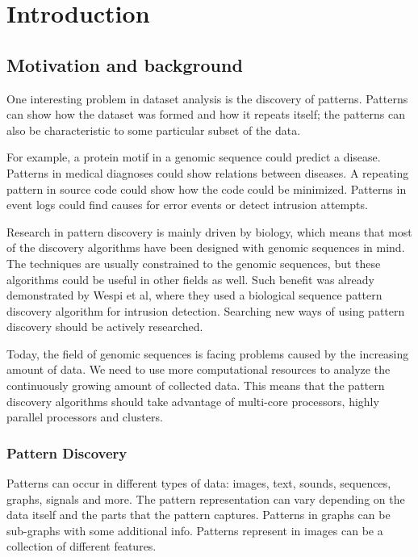 \chapter{Introduction}
\label{c:introduction}

\section{Motivation and background}

One interesting problem in dataset analysis is the discovery of patterns. Patterns can show how the dataset was formed and how it repeats itself; the patterns can also be characteristic to some particular subset of the data.

For example, a protein motif in a genomic sequence could predict a disease. Patterns in medical diagnoses could show relations between diseases. A repeating pattern in source code could show how the code could be minimized. Patterns in event logs could find causes for error events or detect intrusion attempts.

Research in pattern discovery is mainly driven by biology, which means that most of the discovery algorithms have been designed with genomic sequences in mind. The techniques are usually constrained to the genomic sequences, but these algorithms could be useful in other fields as well. Such benefit was already demonstrated by Wespi et al\cite{IntrusionDetection}, where they used a biological sequence pattern discovery algorithm for intrusion detection. Searching new ways of using pattern discovery should be actively researched.

Today, the field of genomic sequences is facing problems caused by the increasing amount of data\cite{BigData,HowIsGenomeDoing}. We need to use more computational resources to analyze the continuously growing amount of collected data. This means that the pattern discovery algorithms should take advantage of multi-core processors, highly parallel processors and clusters.

\subsection{Pattern Discovery}

Patterns can occur in different types of data: images, text, sounds, sequences, graphs, signals and more. The pattern representation can vary depending on the data itself and the parts that the pattern captures. Patterns in graphs can be sub-graphs with some additional info. Patterns represent in images can be a collection of different features.


